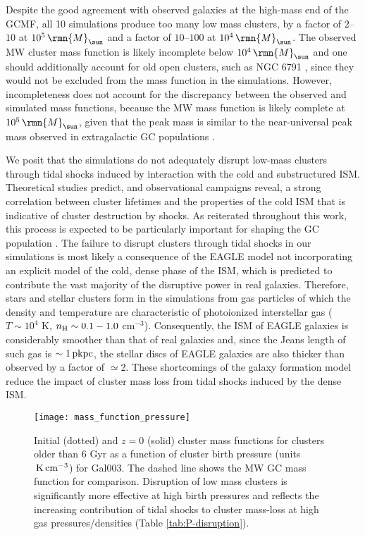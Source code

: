 \documentclass[fleqn,usenatbib]{mnras}
\newcommand\Msun{\,\rmn{M}_{\sun}}
\newcommand{\K}              {\,{\rm K}}
\newcommand{\cmcubed}              {\,{\rm cm}^{-3}}
\newcommand{\pkpc}                      {\,{\rm pkpc}}
\begin{document}
Despite the good agreement with observed galaxies at the high-mass end of the GCMF, all 10 simulations produce too many low mass clusters, by a factor of $2$--$10$ at $10^5 \Msun$ and a factor of $10$--$100$ at $10^4 \Msun$. The observed MW cluster mass function is likely incomplete below $10^4 \Msun$ and one should additionally account for old open clusters, such as NGC 6791 \citep[$\sim 5 \times 10^4 \Msun$,][]{Platais_et_al_11}, since they would not be excluded from the mass function in the simulations. However, incompleteness does not account for the discrepancy between the observed and simulated mass functions, because the MW mass function is likely complete at $10^5 \Msun$, given that the peak mass is similar to the near-universal peak mass observed in extragalactic GC populations \citep[e.g.][]{Jordan_et_al_07_XII}.

We posit that the simulations do not adequately disrupt low-mass clusters through tidal shocks induced by interaction with the cold and substructured ISM. Theoretical studies \citep{Gieles_et_al_06,Elmegreen_and_Hunter_10,Kruijssen_et_al_11} predict, and observational campaigns \citep{Bastian_et_al_12, Miholics_et_al_17} reveal, a strong correlation between cluster lifetimes and the properties of the cold ISM that is indicative of cluster destruction by shocks. As reiterated throughout this work, this process is expected to be particularly important for shaping the GC population \citep{Elmegreen_10,Kruijssen_15}.
The failure to disrupt clusters through tidal shocks in our simulations is most likely a consequence of the EAGLE model not incorporating an explicit model of the cold, dense phase of the ISM, which is predicted to contribute the vast majority of the disruptive power in real galaxies. Therefore, stars and stellar clusters form in the simulations from gas particles of which the density and temperature are characteristic of photoionized interstellar gas ($T \sim 10^4$ K, $n_{\rm H} \sim 0.1-1.0$ cm$^{-3}$). Consequently, the ISM of EAGLE galaxies is considerably smoother than that of real galaxies and, since the Jeans length of such gas is $\sim 1 \pkpc$, the stellar discs of EAGLE galaxies are also thicker than observed by a factor of $\simeq$2. These shortcomings of the galaxy formation model reduce the impact of cluster mass loss from tidal shocks induced by the dense ISM.

\begin{figure}
  \texttt{[image: mass\_function\_pressure]}
  \caption{Initial (dotted) and $z=0$ (solid) cluster mass functions for clusters older than 6 Gyr as a function of cluster birth pressure (units $\K \cmcubed$) for Gal003. The dashed line shows the MW GC mass function \citep{Harris_96} for comparison. Disruption of low mass clusters is significantly more effective at high birth pressures and reflects the increasing contribution of tidal shocks to cluster mass-loss at high gas pressures/densities (Table \ref{tab:P-disruption}).}
  \label{fig:MF_Pressure}
\end{figure}
\end{document}
